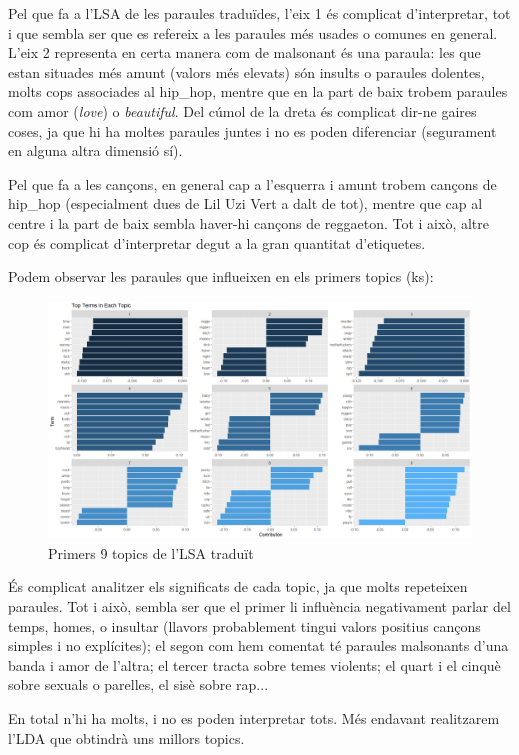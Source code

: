 Pel que fa a l'LSA de les paraules traduïdes, l'eix 1 és complicat d'interpretar, tot i que sembla ser que es refereix a les paraules més usades o comunes en general. L'eix 2 representa en certa manera com de malsonant és una paraula: les que estan situades més amunt (valors més elevats) són insults o paraules dolentes, molts cops associades al hip\_hop, mentre que en la part de baix trobem paraules com amor (\textit{love}) o \textit{beautiful}. Del cúmol de la dreta és complicat dir-ne gaires coses, ja que hi ha moltes paraules juntes i no es poden diferenciar (segurament en alguna altra dimensió sí).

Pel que fa a les cançons, en general cap a l'esquerra i amunt trobem cançons de hip\_hop (especialment dues de Lil Uzi Vert a dalt de tot), mentre que cap al centre i la part de baix sembla haver-hi cançons de reggaeton. Tot i això, altre cop és complicat d'interpretar degut a la gran quantitat d'etiquetes.

Podem observar les paraules que influeixen en els primers topics (ks):

\begin{figure}[H]
    \centering
    \includegraphics[width=0.8\linewidth]{Images//8_Textual//LSA/lsa_topics_1_9.png}
    \caption{Primers 9 topics de l'LSA traduït}
    \label{fig:textual_lsa_topics9}
\end{figure}

És complicat analitzer els significats de cada topic, ja que molts repeteixen paraules. Tot i això, sembla ser que el primer li influència negativament parlar del temps, homes, o insultar (llavors probablement tingui valors positius cançons simples i no explícites); el segon com hem comentat té paraules malsonants d'una banda i amor de l'altra; el tercer tracta sobre temes violents; el quart i el cinquè sobre sexuals o parelles, el sisè sobre rap...

En total n'hi ha molts, i no es poden interpretar tots. Més endavant realitzarem l'LDA que obtindrà uns millors topics.


